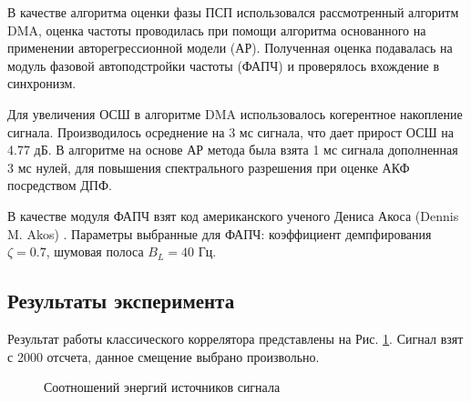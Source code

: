 В качестве алгоритма оценки фазы ПСП использовался
рассмотренный алгоритм DMA, оценка частоты проводилась при помощи алгоритма основанного на применении авторегрессионной модели (АР).
Полученная оценка подавалась на модуль фазовой автоподстройки частоты (ФАПЧ) и проверялось вхождение в синхронизм.

Для увеличения ОСШ в алгоритме DMA использовалось когерентное накопление сигнала. Производилось осреднение на 3 мс сигнала, что дает прирост ОСШ на 4.77 дБ.
В алгоритме на основе АР метода была взята 1 мс сигнала дополненная 3 мс нулей, для повышения спектрального разрешения при оценке АКФ посредством ДПФ.

В качестве модуля ФАПЧ взят код американского ученого Дениса Акоса (Dennis M. Akos) \cite{sandiaproject}.
Параметры выбранные для ФАПЧ: коэффициент демпфирования ${\zeta=0.7}$, шумовая полоса  ${B_L=40}$ Гц. 

\subsection{Результаты эксперимента}

Результат работы классического коррелятора представлены на Рис. \ref{pic:5mhz_sats_all}. Сигнал взят с 2000 отсчета, данное смещение выбрано произвольно.
\begin{figure}[h]
\center{}
	\caption{Соотношений энергий источников сигнала}
	\label{pic:5mhz_sats_all}
\end{figure}

